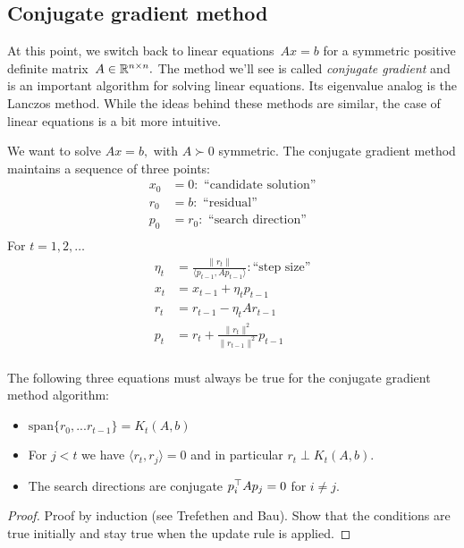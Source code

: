 \subsection{Conjugate gradient method}
At this point, we switch back to linear equations~$Ax=b$ for a symmetric
positive definite matrix~$A\in\mathbb{R}^{n\times n}.$ The method we'll see is called
\emph{conjugate gradient} and is an important algorithm for solving linear
equations. Its eigenvalue analog is the Lanczos method. While the ideas behind
these methods are similar, the case of linear equations is a bit more intuitive.
%
\begin{definition}
We want to solve $Ax = b,$ with  $A\succ 0$ symmetric. The conjugate gradient
method maintains a sequence of three points:
\begin{align*}
x_0 &= 0: \text{ ``candidate solution''} \\
r_0 &= b: \text{ ``residual''} \\
p_0 &= r_0: \text{ ``search direction''} \\
\end{align*}
For $t = 1,2, \dots$
\begin{align*}
\eta_t &= \frac{\|r_t\|}{\langle p_{t-1}, Ap_{t-1}\rangle}: \text{``step size''} \\
x_t &= x_{t-1} + \eta_t p_{t-1} \\
r_t &= r_{t-1} - \eta_t A r_{t-1} \\
p_t &= r_t + \frac{\|r_t\|^2}{\|r_{t-1}\|^2}p_{t-1} \\ 
\end{align*}
\end{definition}

\begin{lemma}
The following three equations must always be true for the conjugate gradient
method algorithm:
\begin{itemize}
\item $\mathrm{span}\{r_0, ...r_{t-1}\} = K_t(A,b)$
\item For $j<t$ we have $\langle r_t, r_j\rangle = 0$ and in particular
$r_t \perp K_t(A,b).$
\item The search directions are conjugate $p_i^{\top} A p_j = 0$ for $i\ne j.$
\end{itemize}
\end{lemma}
\begin{proof}
Proof by induction (see Trefethen and Bau). Show that the conditions are true
initially and stay true when the update rule is applied.  
\end{proof}


